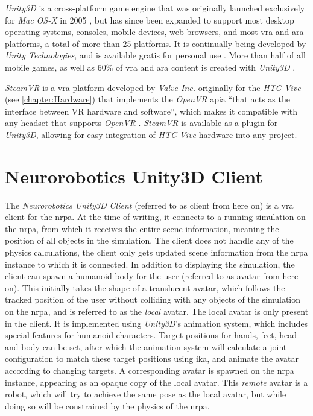\textit{Unity3D} is a cross-platform game engine that was originally launched exclusively for \textit{Mac OS-X} in 2005 \autocite{unityAt10}, but has since been expanded to support most desktop operating systems, consoles, mobile devices, web browsers, and most \gls{vra} and \gls{ara} platforms, a total of more than 25 platforms. It is continually being developed by \textit{Unity Technologies}, and is available gratis for personal use \autocite{unity}.
\newline
More than half of all mobile games, as well as 60\% of \gls{vra} and \gls{ara} content is created with \textit{Unity3D} \autocite{deepMindPartner}.
\newline

\textit{SteamVR} is a \gls{vra} platform developed by \textit{Valve Inc.} originally for the \textit{HTC Vive} (see \autoref{chapter:Hardware}) that implements the \textit{OpenVR} \gls{apia} \enquote{that acts as the interface between VR hardware and software}, which makes it compatible with any headset that supports \textit{OpenVR} \autocite{steamVRArticle}.
\newline
\textit{SteamVR} is available as a plugin for \textit{Unity3D}, allowing for easy integration of \textit{HTC Vive} hardware into any project.



\section{Neurorobotics Unity3D Client}\label{section:NeuroroboticsUnity3DClient}

The \textit{Neurorobotics Unity3D Client} (referred to as client from here on) is a \gls{vra} client for the \gls{nrpa}. At the time of writing, it connects to a running simulation on the \gls{nrpa}, from which it receives the entire scene information, meaning the position of all objects in the simulation. The client does not handle any of the physics calculations, the client only gets updated scene information from the \gls{nrpa} instance to which it is connected.
\newline
In addition to displaying the simulation, the client can spawn a humanoid body for the user (referred to as avatar from here on).
\newline 
This initially takes the shape of a translucent avatar, which follows the tracked position of the user without colliding with any objects of the simulation on the \gls{nrpa}, and is referred to as the \textit{local} avatar. The local avatar is only present in the client. It is implemented using \textit{Unity3D}'s animation system, which includes special features for humanoid characters. Target positions for hands, feet, head and body can be set, after which the animation system will calculate a joint configuration to match these target positions using \gls{ika}, and animate the avatar according to changing targets.
\newline
A corresponding avatar is spawned on the \gls{nrpa} instance, appearing as an opaque copy of the local avatar. This \textit{remote} avatar is a robot, which will try to achieve the same pose as the local avatar, but while doing so will be constrained by the physics of the \gls{nrpa}.

